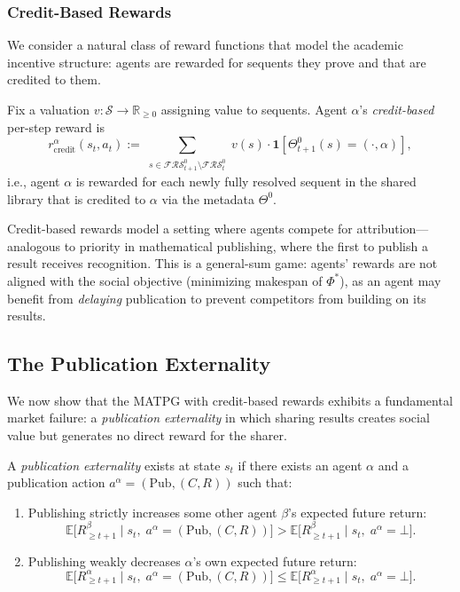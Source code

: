 \subsubsection{Credit-Based Rewards}\label{sec:credit-rewards}

We consider a natural class of reward functions that model the academic incentive structure: agents are rewarded for sequents they prove and that are credited to them.

\begin{definition}\label{def:credit-reward}
Fix a valuation $v:\mathcal{S}\to\mathbb{R}_{\ge 0}$ assigning value to sequents. Agent $\alpha$'s \emph{credit-based} per-step reward is
\[
r^\alpha_{\mathrm{credit}}(s_t,a_t) := \sum_{\substack{s\in\mathcal{FRS}^0_{t+1}\setminus\mathcal{FRS}^0_t}} v(s)\cdot\mathbf{1}[\Theta^0_{t+1}(s) = (\cdot,\alpha)],
\]
i.e., agent $\alpha$ is rewarded for each newly fully resolved sequent in the shared library that is credited to $\alpha$ via the metadata $\Theta^0$.
\end{definition}

Credit-based rewards model a setting where agents compete for attribution---analogous to priority in mathematical publishing, where the first to publish a result receives recognition. This is a general-sum game: agents' rewards are not aligned with the social objective (minimizing makespan of $\Phi^*$), as an agent may benefit from \emph{delaying} publication to prevent competitors from building on its results.


\subsection{The Publication Externality}\label{sec:externality}

We now show that the MATPG with credit-based rewards exhibits a fundamental market failure: a \emph{publication externality} in which sharing results creates social value but generates no direct reward for the sharer.

\begin{definition}\label{def:pub-externality}
A \emph{publication externality} exists at state $s_t$ if there exists an agent $\alpha$ and a publication action $a^\alpha = (\mathrm{Pub},(C,R))$ such that:
\begin{enumerate}
    \item Publishing strictly increases some other agent $\beta$'s expected future return:
    \[
    \mathbb{E}\!\big[R^\beta_{\ge t+1} \mid s_t,\; a^\alpha = (\mathrm{Pub},(C,R))\big] > \mathbb{E}\!\big[R^\beta_{\ge t+1} \mid s_t,\; a^\alpha = \bot\big].
    \]
    \item Publishing weakly decreases $\alpha$'s own expected future return:
    \[
    \mathbb{E}\!\big[R^\alpha_{\ge t+1} \mid s_t,\; a^\alpha = (\mathrm{Pub},(C,R))\big] \le \mathbb{E}\!\big[R^\alpha_{\ge t+1} \mid s_t,\; a^\alpha = \bot\big].
    \]
\end{enumerate}
\end{definition}

